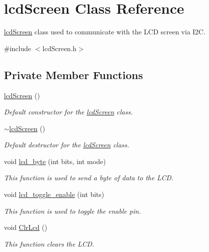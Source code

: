 \hypertarget{classlcdScreen}{}\section{lcd\+Screen Class Reference}
\label{classlcdScreen}


\hyperlink{classlcdScreen}{lcd\+Screen} class used to communicate with the L\+CD screen via I2C.  




{\ttfamily \#include $<$lcd\+Screen.\+h$>$}

\subsection*{Private Member Functions}
\begin{DoxyCompactItemize}
\item 
\hyperlink{classlcdScreen_a23766b7b298478e9a04d44e9a785152d}{lcd\+Screen} ()
\begin{DoxyCompactList}\small\item\em Default constructor for the \hyperlink{classlcdScreen}{lcd\+Screen} class. \end{DoxyCompactList}\item 
\hyperlink{classlcdScreen_a6152bfe573104feced7d836e1eff4d8d}{$\sim$lcd\+Screen} ()
\begin{DoxyCompactList}\small\item\em Default destructor for the \hyperlink{classlcdScreen}{lcd\+Screen} class. \end{DoxyCompactList}\item 
void \hyperlink{classlcdScreen_a3762af911a7fbf78839f0edcd547e042}{lcd\+\_\+byte} (int bits, int mode)
\begin{DoxyCompactList}\small\item\em This function is used to send a byte of data to the L\+CD. \end{DoxyCompactList}\item 
void \hyperlink{classlcdScreen_a070d49963617592f52e359e78dcc1160}{lcd\+\_\+toggle\+\_\+enable} (int bits)
\begin{DoxyCompactList}\small\item\em This function is used to toggle the enable pin. \end{DoxyCompactList}\item 
void \hyperlink{classlcdScreen_a5c1031c6ad92f717e4cec1f9ac6c02c5}{Clr\+Lcd} ()
\begin{DoxyCompactList}\small\item\em This function clears the L\+CD. \end{DoxyCompactList}\item 

\end{DoxyCompactItemize}
